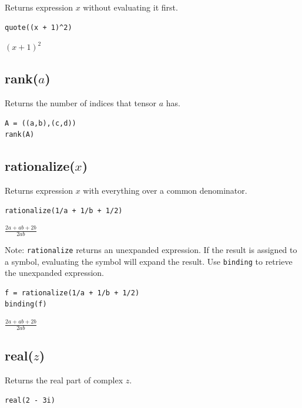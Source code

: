\documentclass[12pt]{article}
\begin{document}
Returns expression $x$ without evaluating it first.

{\color{blue}
\begin{verbatim}
quote((x + 1)^2)
\end{verbatim}
}

\noindent
$\displaystyle (x+1)^2$

\subsection*{rank($a$)}

Returns the number of indices that tensor $a$ has.

{\color{blue}
\begin{verbatim}
A = ((a,b),(c,d))
rank(A)
\end{verbatim}
}


\subsection*{rationalize($x$)}

Returns expression $x$ with everything over a common denominator.

{\color{blue}
\begin{verbatim}
rationalize(1/a + 1/b + 1/2)
\end{verbatim}
}

\noindent
$\displaystyle \frac{2a+ab+2b}{2ab}$

\bigskip
\noindent
Note:
\verb$rationalize$
returns an unexpanded expression.
If the result is assigned to a symbol, evaluating the symbol will expand the result.
Use
\verb$binding$
to retrieve the unexpanded expression.

{\color{blue}
\begin{verbatim}
f = rationalize(1/a + 1/b + 1/2)
binding(f)
\end{verbatim}
}

\noindent
$\displaystyle \frac{2a+ab+2b}{2ab}$

\subsection*{real($z$)}

Returns the real part of complex $z$.

{\color{blue}
\begin{verbatim}
real(2 - 3i)
\end{verbatim}
}

\end{document}
